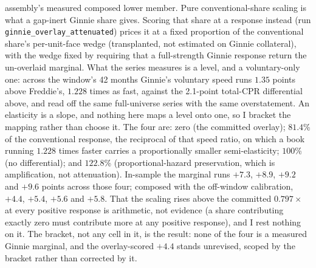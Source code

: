 \documentclass[12pt]{article}
\begin{document}
assembly's measured composed lower member. Pure conventional-share scaling is what a gap-inert Ginnie share gives. Scoring that share at a response instead (run \texttt{ginnie\_overlay\_attenuated}) prices it at a fixed proportion of the conventional share's per-unit-face wedge (transplanted, not estimated on Ginnie collateral), with the wedge fixed by requiring that a full-strength Ginnie response return the un-overlaid marginal. What the series measures is a level, and a voluntary-only one: across the window's 42 months Ginnie's voluntary speed runs $1.35$ points above Freddie's, $1.228$ times as fast, against the 2.1-point total-CPR differential above, and read off the same full-universe series with the same overstatement. An elasticity is a slope, and nothing here maps a level onto one, so I bracket the mapping rather than choose it. The four are: zero (the committed overlay); $81.4$\% of the conventional response, the reciprocal of that speed ratio, on which a book running $1.228$ times faster carries a proportionally smaller semi-elasticity; $100$\% (no differential); and $122.8$\% (proportional-hazard preservation, which is amplification, not attenuation). In-sample the marginal runs $+7.3$, $+8.9$, $+9.2$ and $+9.6$ points across those four; composed with the off-window calibration, $+4.4$, $+5.4$, $+5.6$ and $+5.8$. That the scaling rises above the committed $0.797\times$ at every positive response is arithmetic, not evidence (a share contributing exactly zero must contribute more at any positive response), and I rest nothing on it. The bracket, not any cell in it, is the result: none of the four is a measured Ginnie marginal, and the overlay-scored $+4.4$ stands unrevised, scoped by the bracket rather than corrected by it.
\end{document}
